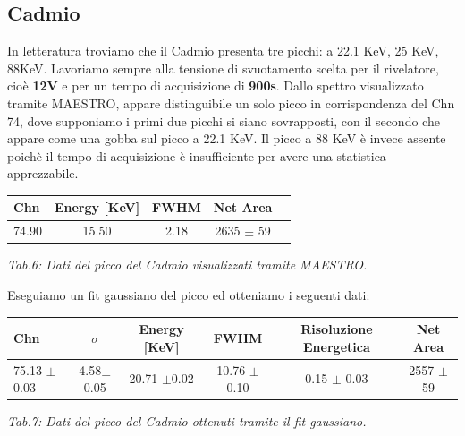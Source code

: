 \documentclass[a4paper]{article}
\begin{document}
\subsection{Cadmio}
In letteratura troviamo che il Cadmio presenta tre picchi: a 22.1 KeV, 25 KeV, 88KeV. Lavoriamo sempre alla tensione di svuotamento scelta per il rivelatore, cioè \textbf{12V} e per un tempo di acquisizione di \textbf{900s}. Dallo spettro visualizzato tramite MAESTRO, appare distinguibile un solo picco in corrispondenza del Chn 74, dove supponiamo i primi due picchi si siano sovrapposti, con il secondo che appare come una gobba sul picco a 22.1 KeV. Il picco a 88 KeV è invece assente poichè il tempo di acquisizione è insufficiente per avere una statistica apprezzabile.  
\begin{center} 
		
		\begin{tabular}{lcccc}
			\hline
			\hline
			\textbf{Chn}      &     \textbf{Energy} [KeV]  &     \textbf{FWHM} &     \textbf{Net Area} 	 \\
			\hline
			\hline
				      74.90  &	15.50	&		2.18 		& 2635 $\pm$ 59			\\
				       
			\hline
			\hline
		\end{tabular}
		\linebreak
		\emph{Tab.6: Dati del picco del Cadmio visualizzati tramite MAESTRO.} 
	\end{center} 	
Eseguiamo un fit gaussiano del picco ed otteniamo i seguenti dati:

\begin{center} 
		
		\begin{tabular}{lccccc}
			\hline
			\hline
			\textbf{Chn} & \textbf{$\sigma$}  &     \textbf{Energy} [KeV]  &     \textbf{FWHM}  & \textbf{Risoluzione Energetica}   & \textbf{Net Area} 	 \\
			\hline
			\hline
				       75.13 $\pm$0.03  & 4.58$\pm$0.05          &	20.71 $\pm$0.02	&		10.76 $\pm$ 0.10 & 0.15 $\pm$ 0.03		& 2557 $\pm$ 59			\\
				       
			\hline
			\hline
		\end{tabular}
		\linebreak
		\emph{Tab.7: Dati del picco del Cadmio ottenuti tramite il fit gaussiano.} 
	\end{center}
	
\end{document}
